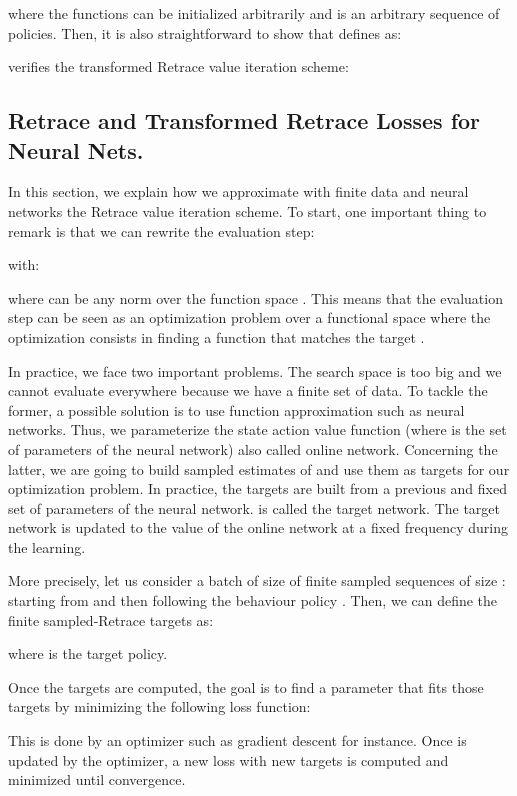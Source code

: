 \documentclass{article}
\begin{document}
where the functions  can be initialized arbitrarily and  is an arbitrary sequence of policies. Then, it is also straightforward to show that  defines as:

verifies the transformed Retrace value iteration scheme:


\subsection{Retrace and Transformed Retrace Losses for Neural Nets.}
\label{subsec:lossfunction}

In this section, we explain how we approximate with finite data and neural networks the Retrace value iteration scheme. To start, one important thing to remark is that we can rewrite the evaluation step:

with:

where  can be any norm over the function space . This means that the evaluation step can be seen as an optimization problem over a functional space where the optimization consists in finding a function  that matches the target .

In practice, we face two important problems. The search space  is too big and we cannot evaluate  everywhere because we have a finite set of data. To tackle the former, a possible solution is to use function approximation such as neural networks. Thus, we parameterize the state action value function  (where  is the set of parameters of the neural network) also called online network. Concerning the latter, we are going to build sampled estimates of  and use them as targets for our optimization problem. In practice, the targets are built from a previous and fixed set of parameters  of the neural network.  is called the target network. The target network is updated to the value of the online network at a fixed frequency during the learning.

More precisely, let us consider a batch of size  of finite sampled sequences of size :  starting from  and then following the behaviour policy .
Then, we can define the finite sampled-Retrace targets as:

where  is the target policy.

Once the targets are computed, the goal is to find a parameter  that fits those targets by minimizing the following loss function:

This is done by an optimizer such as gradient descent for instance. Once  is updated by the optimizer, a new loss with new targets is computed and minimized until convergence.
\end{document}
